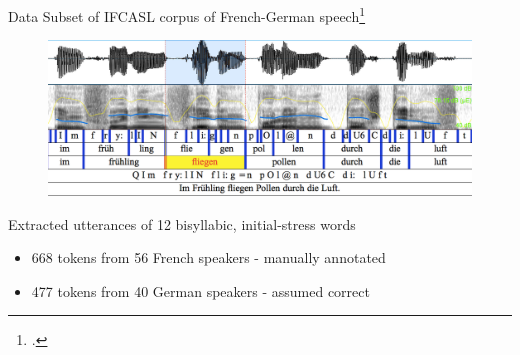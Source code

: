\documentclass[xcolor={dvipsnames}]{beamer}
\begin{document}
\begin{frame}{Data}
Subset of IFCASL corpus of French-German speech\footcite{Fauth2014}
		\begin{figure}
		\includegraphics[width=\textwidth]{praat-screenshot}
		\end{figure}

	

	Extracted utterances of 12 bisyllabic, initial-stress words
	\begin{itemize}
		\item{668 tokens from 56 French speakers - manually annotated}
		\item{477 tokens from 40 German speakers - assumed correct}
	\end{itemize}
\end{frame}
\end{document}
